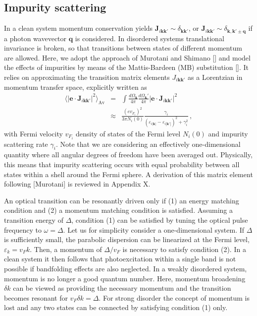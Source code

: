 \documentclass[aps,prb,reprint,noeprint,superscriptaddress]{revtex4-1}
\begin{document}
\subsection{Impurity scattering}
In a clean system momentum conservation yields $\mathbf{J}_{i\mathbf{kk'}} \sim
\delta_{\mathbf{kk'}}$, or $\mathbf{J}_{i\mathbf{kk'}} \sim
\delta_{\mathbf{k,k'}\pm\mathbf{q}}$ if a photon wavevector $\mathbf{q}$ is
considered. In disordered systems translational invariance is broken, so that
transitions between states of different momentum are allowed. Here, we adopt the
approach of Murotani and Shimano [] and model the effects of impurities by
means of the Mattis-Bardeen (MB) substitution []. It relies on approximating the
transition matrix elements $J_{i\mathbf{kk'}}$ as a
Lorentzian in momentum transfer space, explicitly written as
\begin{eqnarray*}
	\langle \left|\mathbf{e} \cdot
	\mathbf{J}_{i\mathbf{kk'}}\right|^2\rangle_{\text{Av}}
	&=& \int \frac{d\Omega_\mathbf{k}}{4\pi} \frac{d\Omega_\mathbf{k}'}{4\pi}
	\left|\mathbf{e} \cdot \mathbf{J}_{i\mathbf{kk'}}\right|^2
	\\
	&\approx& \frac{(e v_{F_i})^2}{3 \pi N_i(0)} 
	\frac{\gamma_i}{\left(\varepsilon_{i|\mathbf{k}|}-\varepsilon_{i|\mathbf{k}'|}\right)^2
	+ \gamma_i^2} \,,
\end{eqnarray*}
with Fermi velocity $v_{F_i}$ density of states of the Fermi level $N_i(0)$ and
impurity scattering rate $\gamma_i$. Note that we are considering an effectively
one-dimensional quantity
where all angular degrees of freedom have been averaged out.
Physically, this means that impurity scattering occurs with equal probability
between all states within a shell around the Fermi sphere.
A derivation of this matrix element
following [Murotani] is reviewed in Appendix X.

An optical transition can be resonantly driven only if (1) an energy matching
condition and (2) a momentum 
matching condition is satisfied. Assuming a transition energy of $\Delta$,
condition
(1) can be satisfied by tuning the optical pulse frequency to $\omega=\Delta$.
Let us for simplicity consider a one-dimensional system. If
$\Delta$ is sufficiently small, the parabolic dispersion can be linearized at
the Fermi level, $\varepsilon_k = v_F k$. Then, a momentum of $\Delta/v_F$ 
is necessary to satisfy condition (2). In a clean system it then follows that
photoexcitation within a single band is not possible
if bandfolding effects are also neglected.
In a weakly disordered system, momentum is no longer a good quantum
number. Here, momentum broadening $\delta k$ can be viewed as providing the necessary
momentum and the transition becomes resonant for $v_F \delta k=\Delta$. For
strong disorder the concept of momentum is lost and any two states
can be connected by satisfying condition (1) only.
\end{document}
